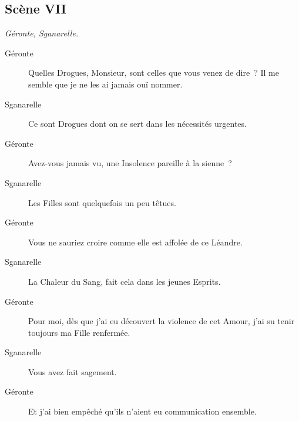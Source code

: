 \documentclass[french,twoside]{book} %
\begin{document}
\subsection[{Scène VII}]{Scène VII}
\label{III07}
\textit{Géronte, Sganarelle.}\par
 \begin{description} \item[Géronte] 

Quelles Drogues, Monsieur, sont celles que vous venez de dire ? Il me semble que je ne les ai jamais ouï nommer.\end{description}
 \begin{description} \item[Sganarelle] 

Ce sont Drogues dont on se sert dans les nécessités urgentes.\end{description}
 \begin{description} \item[Géronte] 

Avez-vous jamais vu, une Insolence pareille à la sienne ?\end{description}
 \begin{description} \item[Sganarelle] 

Les Filles sont quelquefois un peu têtues.\end{description}
 \begin{description} \item[Géronte] 

Vous ne sauriez croire comme elle est affolée de ce Léandre.\end{description}
 \begin{description} \item[Sganarelle] 

La Chaleur du Sang, fait cela dans les jeunes Esprits.\end{description}
 \begin{description} \item[Géronte] 

Pour moi, dès que j’ai eu découvert la violence de cet Amour, j’ai su tenir toujours ma Fille renfermée.\end{description}
 \begin{description} \item[Sganarelle] 

Vous avez fait sagement.\end{description}
 \begin{description} \item[Géronte] 

Et j’ai bien empêché qu’ils n’aient eu communication ensemble.\end{description}
\end{document}
